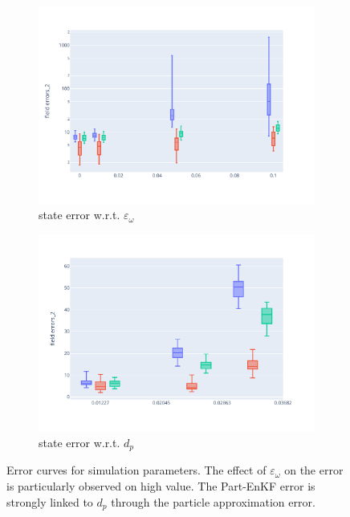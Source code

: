 \begin{figure}[htbp]
	\centering

	\begin{subfigure}{0.48\textwidth}
		\centering
		\includegraphics[width=\linewidth]{./images/app2d/MSE_eps_omega_box.pdf}
		\captionsetup{labelformat=empty}
		\caption{state error w.r.t. $\varepsilon_{\omega}$}
		\label{fig:eps_omega}
	\end{subfigure}

	\begin{subfigure}{0.48\textwidth}
		\centering
		\includegraphics[width=\linewidth]{./images/app2d/MSE_dp_box.pdf}
		\captionsetup{labelformat=empty}
		\caption{state error w.r.t. $d_p$}
		\label{fig:np_visc}
	\end{subfigure}

	\caption{Error curves for simulation parameters. The effect of $\varepsilon_{\omega}$ on the error is particularly observed on high value. The Part-EnKF error is strongly linked to $d_p$ through the particle approximation error.}
	\label{fig:simu_parameters_error}
\end{figure}

